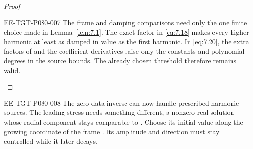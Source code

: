 \begin{proof}
\begin{EESegment}{EE-TGT-P080-007}
The frame and damping comparisons need only the one finite choice made in Lemma~\ref{lem:7.1}. The exact factor in \eqref{eq:7.18} makes every higher harmonic at least as damped in value as the first harmonic. In \eqref{eq:7.20}, the extra factors of  and the coefficient derivatives raise only the constants and polynomial degrees in the source bounds. The already chosen threshold  therefore remains valid.
\end{EESegment}
\end{proof}

\begin{EESegment}{EE-TGT-P080-008}
The zero-data inverse can now handle prescribed harmonic sources. The leading stress needs something different, a nonzero real solution whose radial component stays comparable to . Choose its initial value along the growing coordinate of the frame . Its amplitude and direction must stay controlled while it later decays.
\end{EESegment}


